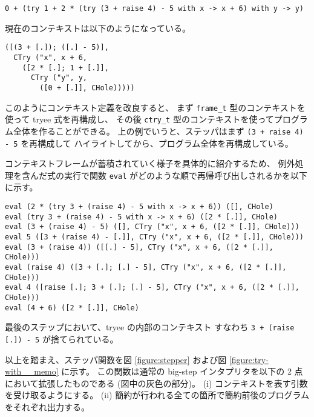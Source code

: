 \begin{verbatim}
0 + (try 1 + 2 * (try (3 + raise 4) - 5 with x -> x + 6) with y -> y)
\end{verbatim}
\noindent 現在のコンテキストは以下のようになっている。
\begin{verbatim}
([(3 + [.]); ([.] - 5)],
  CTry ("x", x + 6,
    ([2 * [.]; 1 + [.]],
      CTry ("y", y,
        ([0 + [.]], CHole)))))
\end{verbatim}

このようにコンテキスト定義を改良すると、
まず \texttt{frame\_t} 型のコンテキストを使って tryee 式を再構成し、
その後 \texttt{ctry\_t} 型のコンテキストを使ってプログラム全体を作ることができる。
上の例でいうと、ステッパはまず \texttt{(3 + raise 4) - 5} を再構成して
ハイライトしてから、プログラム全体を再構成している。

コンテキストフレームが蓄積されていく様子を具体的に紹介するため、
例外処理を含んだ式の実行で関数 \texttt{eval} がどのような順で再帰呼び出しされるかを以下に示す。

\begin{verbatim}
eval (2 * (try 3 + (raise 4) - 5 with x -> x + 6)) ([], CHole)
eval (try 3 + (raise 4) - 5 with x -> x + 6) ([2 * [.]], CHole)
eval (3 + (raise 4) - 5) ([], CTry ("x", x + 6, ([2 * [.]], CHole)))
eval 5 ([3 + (raise 4) - [.]], CTry ("x", x + 6, ([2 * [.]], CHole)))
eval (3 + (raise 4)) ([[.] - 5], CTry ("x", x + 6, ([2 * [.]], CHole)))
eval (raise 4) ([3 + [.]; [.] - 5], CTry ("x", x + 6, ([2 * [.]], CHole)))
eval 4 ([raise [.]; 3 + [.]; [.] - 5], CTry ("x", x + 6, ([2 * [.]], CHole)))
eval (4 + 6) ([2 * [.]], CHole)
\end{verbatim}

\noindent 最後のステップにおいて、tryee の内部のコンテキスト
すなわち \texttt{3 + (raise [.])\ - 5} が捨てられている。

以上を踏まえ、ステッパ関数を図 \ref{figure:stepper} および図 \ref{figure:try-with__memo} に示す。
この関数は通常の big-step インタプリタを以下の 2 点において拡張したものである (図中の灰色の部分)。
(i) コンテキストを表す引数を受け取るようにする。
(ii) 簡約が行われる全ての箇所で簡約前後のプログラムをそれぞれ出力する。

